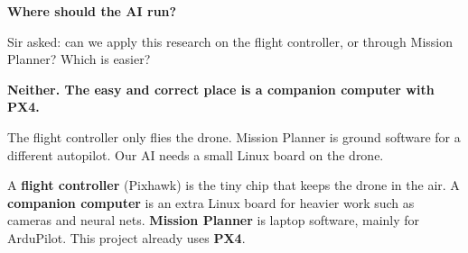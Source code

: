 \documentclass[11pt,a4paper]{article}
\newcommand{\seriftitle}{\rmfamily\bfseries\color{navy}}
\begin{document}
{\seriftitle\fontsize{26}{30}\selectfont Where should the AI run?\par}
\vspace{8mm}

{\fontsize{12}{17}\selectfont\color{body}%
Sir asked: can we apply this research on the flight controller, or through Mission Planner? Which is easier?\par}
\vspace{5.5mm}

{\seriftitle\fontsize{13.5}{18}\selectfont
Neither. The easy and correct place is a companion computer with PX4.\par}
\vspace{2.6mm}

{\fontsize{11}{16}\selectfont\color{body}%
The flight controller only flies the drone. Mission Planner is ground software for a different autopilot. Our AI needs a small Linux board on the drone.\par}
\vspace{6mm}

{\fontsize{9.5}{14}\selectfont\color{quiet}%
A \textbf{\color{navy}flight controller} (Pixhawk) is the tiny chip that keeps the drone in the air. A \textbf{\color{navy}companion computer} is an extra Linux board for heavier work such as cameras and neural nets. \textbf{\color{navy}Mission Planner} is laptop software, mainly for ArduPilot. This project already uses \textbf{\color{navy}PX4}.\par}
\vspace{7mm}
\end{document}
